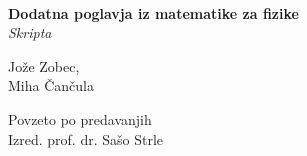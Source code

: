 \documentclass[a4paper]{book}
\begin{document}
\begin{titlepage}
	\begin{center}
	\ \\[5cm]
	\LARGE{\bf Dodatna poglavja iz matematike za fizike}\\[0.5cm]
	\large{\it Skripta}\\[3cm]
	\begin{minipage}{0.4\textwidth}\small
		\begin{flushleft}
			\large{Jo\v ze Zobec,}\\[0.5cm]
			\large{Miha \v Can\v cula}
		\end{flushleft}
	\end{minipage}
	\begin{minipage}{0.4\textwidth}\small
		\begin{flushright}
			\large{\sc Povzeto po predavanjih}\\[0.5cm]
			\large{Izred. prof. dr. Sa\v so Strle}
		\end{flushright}
	\end{minipage}
	\end{center}
\end{titlepage}






\end{document}
